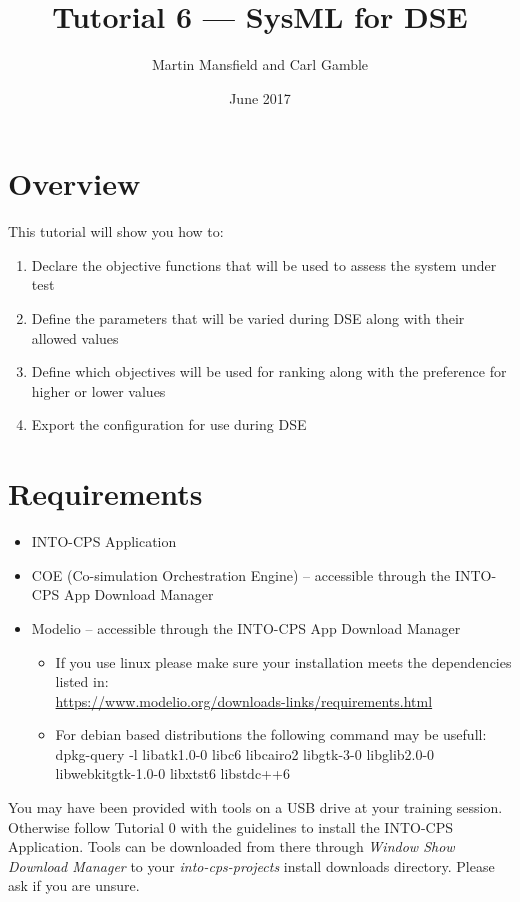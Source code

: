 \documentclass[11pt,a4paper]{../tutorial}
\title{Tutorial 6 --- SysML for DSE}
\date{June 2017}
\author{Martin Mansfield and Carl Gamble}
\begin{document}
\section*{Overview}

This tutorial will show you how to:

\begin{enumerate}[noitemsep]
\item Declare the objective functions that will be used to assess the system under test
\item Define the parameters that will be varied during DSE along with their allowed values
\item Define which objectives will be used for ranking along with the preference for higher or lower values
\item Export the configuration for use during DSE
\end{enumerate}

\section*{Requirements}

\begin{itemize}[noitemsep]
	\item INTO-CPS Application
	\item COE (Co-simulation Orchestration Engine) -- accessible through the INTO-CPS App Download Manager
	\item Modelio -- accessible through the INTO-CPS App Download Manager
	\begin{small}
		\begin{itemize}
			\item If you use linux please make sure your installation meets the dependencies listed in:\\ \url{https://www.modelio.org/downloads-links/requirements.html}
			\item For debian based distributions the following command may be usefull:\\
			dpkg-query -l  libatk1.0-0 libc6 libcairo2 libgtk-3-0 libglib2.0-0 libwebkitgtk-1.0-0 libxtst6 libstdc++6
		\end{itemize}
	\end{small}
\end{itemize}

You may have been provided with tools on a USB drive at your training session. Otherwise follow Tutorial 0 with the guidelines to install the INTO-CPS Application. Tools can be downloaded from there through \emph{Window \menusep Show Download Manager} to your \emph{into-cps-projects} install downloads directory. Please ask if you are unsure.
\end{document}
